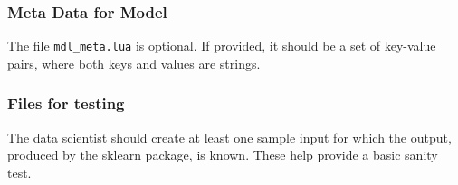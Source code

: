 \subsubsection{Meta Data for Model}
\label{mdl_meta}
The file \verb+mdl_meta.lua+ is optional. If provided, it should be 
a set of key-value pairs, where both keys and values are strings. 

\subsubsection{Files for testing}
\label{test_files}
The data scientist should create at least one sample input for which the output,
produced by the sklearn package, is known. These help provide a basic sanity
test. 

